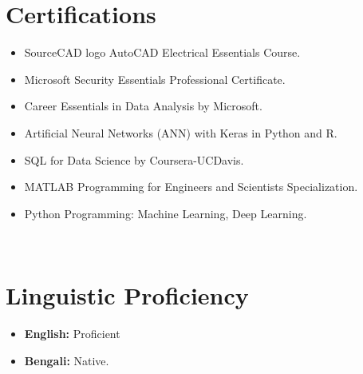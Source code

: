 \documentclass[a4paper,11pt]{article}
\begin{document}
\section{Certifications}
\begin{minipage}[t]{\linewidth}
    \begin{itemize}[nosep,after=\strut, leftmargin=1em, itemsep=2pt]
        \vspace{5pt}
        \item SourceCAD logo AutoCAD Electrical Essentials Course.
        \item Microsoft Security Essentials Professional Certificate.
        \item Career Essentials in Data Analysis by Microsoft.
        \item Artificial Neural Networks (ANN) with Keras in Python and R.
        \item SQL for Data Science by Coursera-UCDavis.
        \item MATLAB Programming for Engineers and Scientists Specialization.
        \item Python Programming: Machine Learning, Deep Learning.
        \end{itemize}
\end{minipage}\\[-5pt]

 

\section{Linguistic Proficiency}
\begin{minipage}[t]{\linewidth}
    \begin{itemize}[nosep, leftmargin=0.1em, itemsep=2pt, label=]
        \vspace{5pt}
        \item \textbf{English:} Proficient %
        \item \textbf{Bengali:} Native. 
        \end{itemize}
\end{minipage}\\[-1pt]
\end{document}
